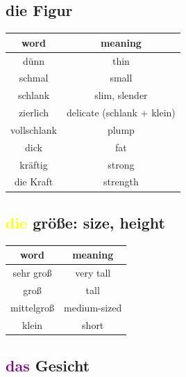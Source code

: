 \subsection{die Figur}
\begin{center}
    \begin{tabular}{|c|c|}
        \hline
        \rowcolor{gray}
        word        & meaning                    \\
        \hline
        dünn        & thin                       \\
        schmal      & small                      \\
        \hline
        schlank     & slim, slender              \\
        \hline
        zierlich    & delicate (schlank + klein) \\
        \hline
        vollschlank & plump                      \\
        \hline
        dick        & fat                        \\
        \hline
        kräftig     & strong                     \\
        die Kraft   & strength                   \\
        \hline
    \end{tabular}
\end{center}

\subsection{\textcolor{yellow}{die} größe: size, height}

\begin{center}
    \begin{tabular}{|c|c|}
        \hline
        \rowcolor{gray}
        word       & meaning      \\
        \hline
        sehr groß  & very tall    \\
        \hline
        groß       & tall         \\
        \hline
        mittelgroß & medium-sized \\
        \hline
        klein      & short        \\
        \hline
    \end{tabular}
\end{center}

\subsection{\textcolor{purple}{das} Gesicht}

